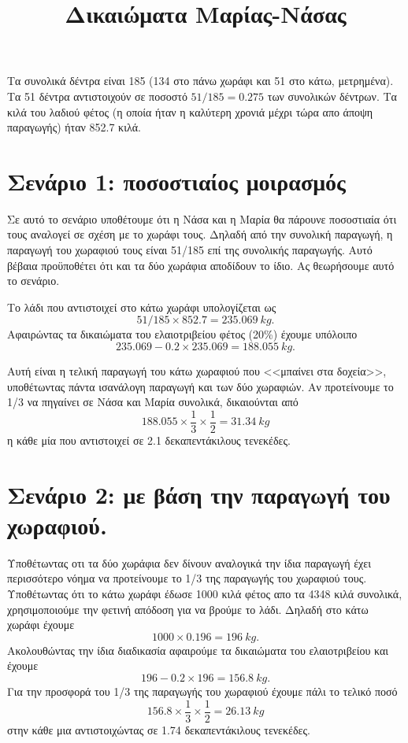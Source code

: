 \documentclass[12pt,a4paper]{article}
\date{}
\title{Δικαιώματα Μαρίας-Νάσας}
\begin{document}
\maketitle
Τα συνολικά δέντρα είναι 185 (134 στο πάνω χωράφι και 51 στο κάτω, μετρημένα). Τα 51 δέντρα αντιστοιχούν σε ποσοστό $51/185=0.275$ των συνολικών δέντρων. Τα κιλά του λαδιού φέτος (η οποία ήταν η καλύτερη χρονιά μέχρι τώρα απο άποψη παραγωγής) ήταν 852.7 κιλά. 

\section{Σενάριο 1: ποσοστιαίος μοιρασμός}
Σε αυτό το σενάριο υποθέτουμε ότι η Νάσα και η Μαρία θα πάρουνε ποσοστιαία ότι τους αναλογεί σε σχέση με το χωράφι τους. Δηλαδή από την συνολική παραγωγή, η παραγωγή του χωραφιού τους είναι 51/185 επί της συνολικής παραγωγής. Αυτό βέβαια προϋποθέτει ότι και τα δύο χωράφια αποδίδουν το ίδιο. Ας θεωρήσουμε αυτό το σενάριο. 

Το λάδι που αντιστοιχεί στο κάτω χωράφι υπολογίζεται ως
\begin{equation}\nonumber
51/185\times 852.7=235.069~kg.
\end{equation} 
Αφαιρώντας τα δικαιώματα του ελαιοτριβείου φέτος (20\%) έχουμε υπόλοιπο
\begin{equation}\nonumber
235.069-0.2\times235.069=188.055~kg.
\end{equation} 

Αυτή είναι η τελική παραγωγή του κάτω χωραφιού που <<μπαίνει στα δοχεία>>, υποθέτωντας πάντα ισανάλογη παραγωγή και των δύο χωραφιών. Αν προτείνουμε το 1/3 να πηγαίνει σε Νάσα και Μαρία συνολικά, δικαιούνται από 
\begin{equation}\nonumber
188.055\times\frac{1}{3}\times\frac{1}{2}= 31.34~kg 
\end{equation} 
η κάθε μία που αντιστοιχεί σε 2.1 δεκαπεντάκιλους τενεκέδες.

\section{Σενάριο 2: με βάση την παραγωγή του χωραφιού.}
Υποθέτωντας οτι τα δύο χωράφια δεν δίνουν αναλογικά την ίδια παραγωγή έχει περισσότερο νόημα να προτείνουμε το 1/3 της παραγωγής του χωραφιού τους. Υποθέτωντας ότι το κάτω χωράφι έδωσε 1000 κιλά φέτος απο τα 4348 κιλά συνολικά, χρησιμοποιούμε την φετινή απόδοση για να βρούμε το λάδι. Δηλαδή στο κάτω χωράφι έχουμε 
 \begin{equation}\nonumber
 1000\times 0.196=196~kg. 
 \end{equation} 
 Ακολουθώντας την ίδια διαδικασία αφαιρούμε τα δικαιώματα του ελαιοτριβείου και έχουμε 
 \begin{equation}\nonumber
 196-0.2\times196=156.8~kg.
 \end{equation} 
Για την προσφορά του 1/3 της παραγωγής του χωραφιού έχουμε πάλι το τελικό ποσό
\begin{equation}\nonumber
156.8\times\frac{1}{3}\times\frac{1}{2}= 26.13~kg 
\end{equation} 
στην κάθε μια αντιστοιχώντας σε 1.74 δεκαπεντάκιλους τενεκέδες. 
\end{document}
